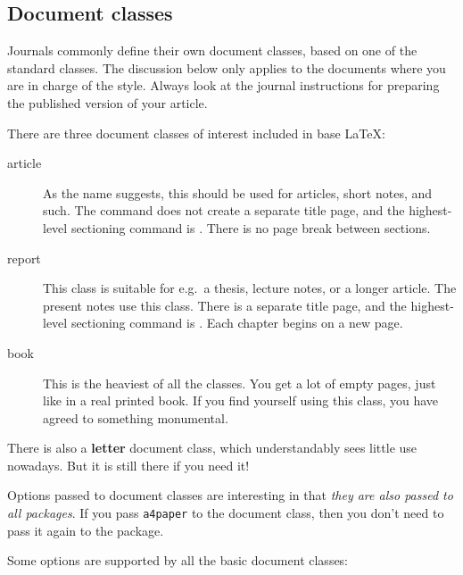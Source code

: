 %
\subsection{Document classes}

\begin{practices}
Journals commonly define their own document classes, based on one of the standard classes.
The discussion below only applies to the documents where you are in charge of the style.
Always look at the journal instructions for preparing the published version of your article.
\end{practices}

There are three document classes of interest included in base \LaTeX{}:

\begin{description}
\item[article] As the name suggests, this should be used for articles, short notes, and such.
    The  command does not create a separate title page,
    and the highest-level sectioning command is .
    There is no page break between sections.
\item[report] This class is suitable for e.g.\ a thesis, lecture notes, or a longer article.
    The present notes use this class.
    There is a separate title page,
    and the highest-level sectioning command is .
    Each chapter begins on a new page.
\item[book] This is the heaviest of all the classes.
    You get a lot of empty pages, just like in a real printed book.
    If you find yourself using this class,
    you have agreed to something monumental.
\end{description}
%
There is also a \textbf{letter} document class,
which understandably sees little use nowadays.
But it is still there if you need it!

Options passed to document classes are interesting in that
\emph{they are also passed to all packages}.
If you pass \verb|a4paper| to the document class,
then you don't need to pass it again to the  package.

Some options are supported by all the basic document classes:

